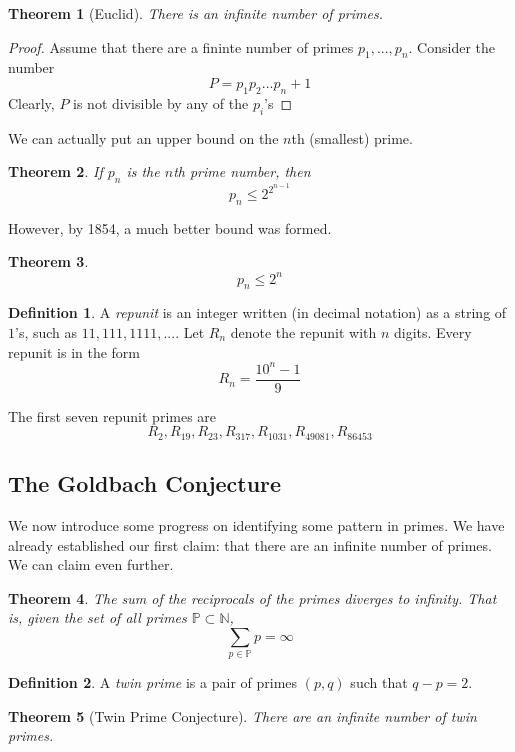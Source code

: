 \documentclass{article}
\newtheorem{theorem}{Theorem}[section]
\theoremstyle{remark}
\theoremstyle{definition}
\newtheorem{definition}{Definition}[section]
\begin{document}
\begin{theorem}[Euclid]
There is an infinite number of primes.
\end{theorem}
\begin{proof}
Assume that there are a fininte number of primes $p_1, ..., p_n$. Consider the number 
\[P = p_1 p_2... p_n + 1\]
Clearly, $P$ is not divisible by any of the $p_i$'s 
\end{proof}

We can actually put an upper bound on the $n$th (smallest) prime. 

\begin{theorem}
If $p_n$ is the $n$th prime number, then 
\[p_n \leq 2^{2^{n-1}}\]
\end{theorem}

However, by 1854, a much better bound was formed. 
\begin{theorem}
\[p_n \leq 2^n\]
\end{theorem}

\begin{definition}
A \textit{repunit} is an integer written (in decimal notation) as a string of $1$'s, such as $11, 111, 1111, ...$. Let $R_n$ denote the repunit with $n$ digits. Every repunit is in the form 
\[R_n = \frac{10^n - 1}{9}\]
\end{definition}

The first seven repunit primes are
\[R_2, R_{19}, R_{23}, R_{317}, R_{1031}, R_{49081}, R_{86453}\]

\subsection{The Goldbach Conjecture}
We now introduce some progress on identifying some pattern in primes. We have already established our first claim: that there are an infinite number of primes. We can claim even further. 

\begin{theorem}
The sum of the reciprocals of the primes diverges to infinity. That is, given the set of all primes $\mathbb{P} \subset \mathbb{N}$,
\[\sum_{p \in \mathbb{P}} p = \infty\]
\end{theorem}

\begin{definition}
A \textit{twin prime} is a pair of primes $(p, q)$ such that $q-p = 2$. 
\end{definition}

\begin{theorem}[Twin Prime Conjecture]
There are an infinite number of twin primes. 
\end{theorem}
\end{document}
